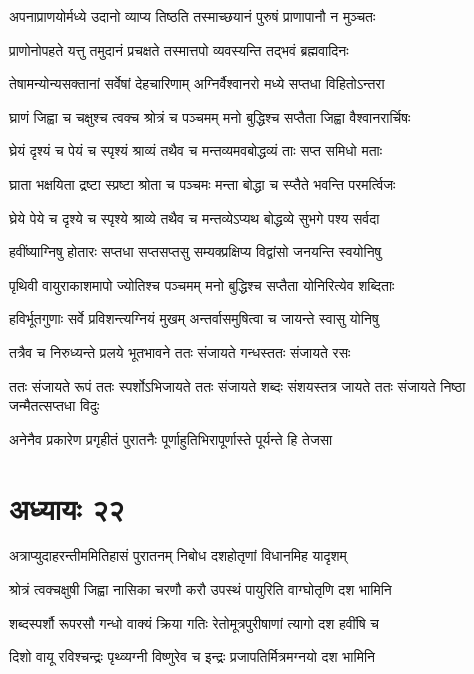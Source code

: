 \twolineshloka
{अपनाप्राणयोर्मध्ये उदानो व्याप्य तिष्ठति}
{तस्माच्छयानं पुरुषं प्राणापानौ न मुञ्चतः}


\twolineshloka
{प्राणोनोपहते यत्तु तमुदानं प्रचक्षते}
{तस्मात्तपो व्यवस्यन्ति तद्भवं ब्रह्मवादिनः}


\twolineshloka
{तेषामन्योन्यसक्तानां सर्वेषां देहचारिणाम्}
{अग्निर्वैश्वानरो मध्ये सप्तधा विहितोऽन्तरा}


\twolineshloka
{घ्राणं जिह्वा च चक्षुश्च त्वक्च श्रोत्रं च पञ्चमम्}
{मनो बुद्धिश्च सप्तैता जिह्वा वैश्वानरार्चिषः}


\twolineshloka
{घ्रेयं दृश्यं च पेयं च स्पृश्यं श्राव्यं तथैव च}
{मन्तव्यमवबोद्धव्यं ताः सप्त समिधो मताः}


\twolineshloka
{घ्राता भक्षयिता द्रष्टा स्प्रष्टा श्रोता च पञ्चमः}
{मन्ता बोद्धा च स्प्तैते भवन्ति परमर्त्विजः}


\twolineshloka
{घ्रेये पेये च दृश्ये च स्पृश्ये श्राव्ये तथैव च}
{मन्तव्येऽप्यथ बोद्धव्ये सुभगे पश्य सर्वदा}


\twolineshloka
{हवींष्याग्निषु होतारः सप्तधा सप्तसप्तसु}
{सम्यक्प्रक्षिप्य विद्वांसो जनयन्ति स्वयोनिषु}


\twolineshloka
{पृथिवी वायुराकाशमापो ज्योतिश्च पञ्चमम्}
{मनो बुद्धिश्च सप्तैता योनिरित्येव शब्दिताः}


\twolineshloka
{हविर्भूतगुणाः सर्वे प्रविशन्त्यग्नियं मुखम्}
{अन्तर्वासमुषित्वा च जायन्ते स्वासु योनिषु}


\twolineshloka
{तत्रैव च निरुध्यन्ते प्रलये भूतभावने}
{ततः संजायते गन्धस्ततः संजायते रसः}


\threelineshloka
{ततः संजायते रूपं ततः स्पर्शोऽभिजायते}
{ततः संजायते शब्दः संशयस्तत्र जायते}
{ततः संजायते निष्ठा जन्मैतत्सप्तधा विदुः}


\twolineshloka
{अनेनैव प्रकारेण प्रगृहीतं पुरातनैः}
{पूर्णाहुतिभिरापूर्णास्ते पूर्यन्ते हि तेजसा}


\chapter{अध्यायः २२}
\twolineshloka
{अत्राप्युदाहरन्तीममितिहासं पुरातनम्}
{निबोध दशहोतृणां विधानमिह यादृशम्}


\twolineshloka
{श्रोत्रं त्वक्चक्षुषी जिह्वा नासिका चरणौ करौ}
{उपस्थं पायुरिति वाग्घोतृणि दश भामिनि}


\twolineshloka
{शब्दस्पर्शौ रूपरसौ गन्धो वाक्यं क्रिया गतिः}
{रेतोमूत्रपुरीषाणां त्यागो दश हवींषि च}


\twolineshloka
{दिशो वायू रविश्चन्द्रः पृथ्व्यग्नी विष्णुरेव च}
{इन्द्रः प्रजापतिर्मित्रमग्नयो दश भामिनि}


